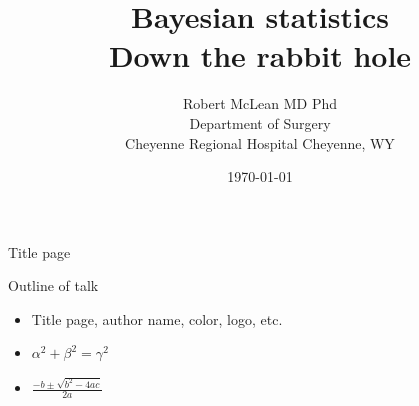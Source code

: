 \documentclass{beamer}
\begin{document}
\sffamily \bfseries

\title[this is a the title that goes in the lower right\hspace{.25 cm}\insertframenumber/\inserttotalframenumber]{Bayesian statistics\\Down the rabbit hole}
\author[Robert McLean MD PhD]{Robert McLean MD Phd\\
Department of Surgery\\
Cheyenne Regional Hospital Cheyenne, WY}
\date{\today}

\begin{frame}{Title page}	
\titlepage
\end{frame}

\begin{frame}{Outline of talk}
\begin{itemize}
\item Title page, author name, color, logo, etc.
\item $\alpha^2+\beta^2=\gamma^2$
\item $ \frac{-b\pm\sqrt{b^2-4ac}}{2a} $
\end{itemize}
\end{frame}
\end{document}
